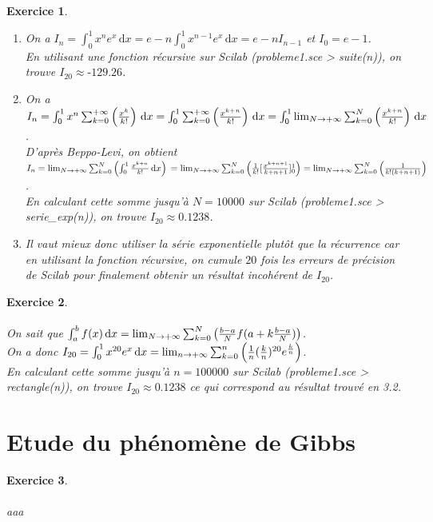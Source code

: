 \documentclass[a4paper,11pt]{article}
\newtheorem{exo}{Exercice}
\begin{document}
\begin{exo} \ \\
\begin{enumerate}
\item On a $ I_n=\int_{0}^{1} x^ne^x \, \mathrm{d}x = e-n\int_{0}^{1} x^{n-1}e^x \, \mathrm{d}x = e-nI_{n-1} $ et $ I_0=e-1 $. \ \\
En utilisant une fonction récursive sur Scilab (probleme1.sce > suite(n)), on trouve $ I_{20}\approx\text{-}129.26 $.
\item On a $ I_n = \int_{0}^{1} x^n\sum_{k=0}^{\text{+}\infty} \left (\frac{x^k}{k!} \right) \, \mathrm{d}x = \int_{0}^{1} \sum_{k=0}^{\text{+}\infty} \left (\frac{x^{k+n}}{k!} \right) \, \mathrm{d}x = \int_{0}^{1} \lim_{N\to\\{\text{+}\infty}}\sum_{k=0}^{N} \left (\frac{x^{k+n}}{k!} \right) \, \mathrm{d}x $. \ \\
D'après Beppo-Levi, on obtient $ I_n = \lim_{N\to\\{\text{+}\infty}}\sum_{k=0}^{N} \left(\int_{0}^{1} \frac{x^{k+n}}{k!} \, \mathrm{d}x \right) \newline = \lim_{N\to\\{\text{+}\infty}}\sum_{k=0}^{N} \left(\frac{1}{k!}[\frac{x^{k+n+1}}{k+n+1}]_0^1 \right) = \lim_{N\to\\{\text{+}\infty}}\sum_{k=0}^{N} \left(\frac{1}{k!(k+n+1)} \right) $. \ \\
En calculant cette somme jusqu'à $ N=10000 $ sur Scilab (probleme1.sce > serie\_exp(n)), on trouve $ I_{20}\approx0.1238 $.
\item Il vaut mieux donc utiliser la série exponentielle plutôt que la récurrence car en utilisant la fonction récursive, on cumule $ 20 $ fois les erreurs de précision de Scilab pour finalement obtenir un résultat incohérent de $ I_{20} $.
\end{enumerate}
\end{exo}

\begin{exo} \ \\ \\
On sait que $ \int_{a}^{b} f(x) \, \mathrm{d}x = \lim_{N\to\\{\text{+}\infty}}\sum_{k=0}^{N} \left(\frac{b-a}{N}f(a+k\frac{b-a}{N}) \right) $. \ \\
On a donc $ I_{20} = \int_{0}^{1} x^{20}e^x \, \mathrm{d}x = \lim_{n\to\\{\text{+}\infty}}\sum_{k=0}^{n} \left(\frac{1}{n}(\frac{k}{n})^{20}e^{\frac{k}{n}} \right) $. \ \\
En calculant cette somme jusqu'à $ n=100000 $ sur Scilab (probleme1.sce > rectangle(n)), on trouve $ I_{20}\approx0.1238 $ ce qui correspond au résultat trouvé en 3.2.
\end{exo}

\section{Etude du phénomène de Gibbs}

\begin{exo} \ \\ \\
aaa
\end{exo}

\end{document}
